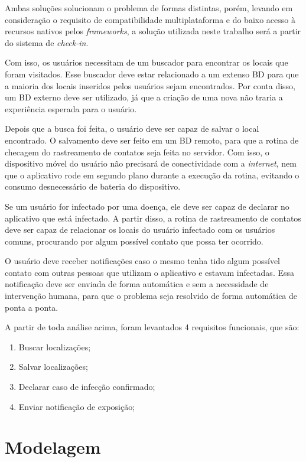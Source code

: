 Ambas soluções solucionam o problema de formas distintas, porém, levando em consideração o requisito de compatibilidade multiplataforma e do baixo acesso à recursos nativos pelos \textit{frameworks}, a solução utilizada neste trabalho será a partir do sistema de \textit{check-in}.

Com isso, os usuários necessitam de um buscador para encontrar os locais que foram visitados. Esse buscador deve estar relacionado a um extenso BD para que a maioria dos locais inseridos pelos usuários sejam encontrados. Por conta disso, um BD externo deve ser utilizado, já que a criação de uma nova não traria a experiência esperada para o usuário.

Depois que a busca foi feita, o usuário deve ser capaz de salvar o local encontrado. O salvamento deve ser feito em um BD remoto, para que a rotina de checagem do rastreamento de contatos seja feita no servidor. Com isso, o dispositivo móvel do usuário não precisará de conectividade com a \textit{internet}, nem que o aplicativo rode em segundo plano durante a execução da rotina, evitando o consumo desnecessário de bateria do dispositivo.

Se um usuário for infectado por uma doença, ele deve ser capaz de declarar no aplicativo que está infectado. A partir disso, a rotina de rastreamento de contatos deve ser capaz de relacionar os locais do usuário infectado com os usuários comuns, procurando por algum possível contato que possa ter ocorrido.

O usuário deve receber notificações caso o mesmo tenha tido algum possível contato com outras pessoas que utilizam o aplicativo e estavam infectadas. Essa notificação deve ser enviada de forma automática e sem a necessidade de intervenção humana, para que o problema seja resolvido de forma automática de ponta a ponta.

A partir de toda análise acima, foram levantados 4 requisitos funcionais, que são:

\begin{enumerate}
  \item Buscar localizações;
  \item Salvar localizações;
  \item Declarar caso de infecção confirmado;
  \item Enviar notificação de exposição;
\end{enumerate}

\section{Modelagem}\label{sec:modelagem}

